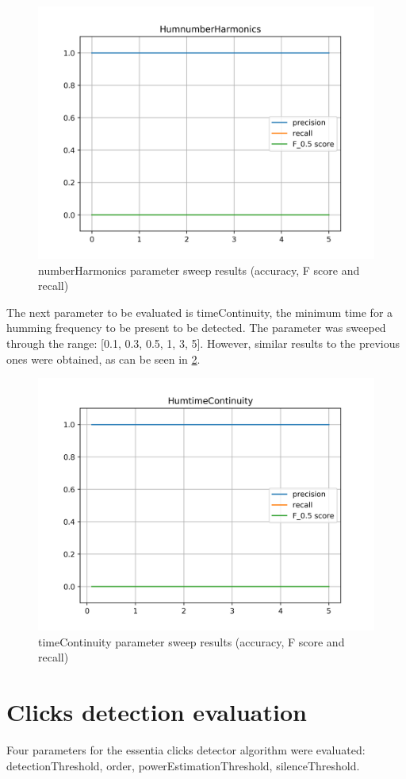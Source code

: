 \begin{figure}[H]
	\centering
	\includegraphics[clip,width=0.7\columnwidth]{Figures/HumnumberHarmonics.png}%
	\caption{numberHarmonics parameter sweep results (accuracy, F score and recall)}
	\label{fig:humnumberHarmonics}
\end{figure}

The next parameter to be evaluated is timeContinuity, the minimum time for a humming frequency to be present to be detected. The parameter was sweeped through the range: [0.1, 0.3, 0.5, 1, 3, 5]. However, similar results to the previous ones were obtained, as can be seen in \ref{fig:humtimeContinuity}.

\begin{figure}[H]
	\centering
	\includegraphics[clip,width=0.7\columnwidth]{Figures/HumtimeContinuity.png}%
	\caption{timeContinuity parameter sweep results (accuracy, F score and recall)}
	\label{fig:humtimeContinuity}
\end{figure}

\section{Clicks detection evaluation}
Four parameters for the essentia clicks detector algorithm were evaluated: detectionThreshold, order, powerEstimationThreshold, silenceThreshold. 

